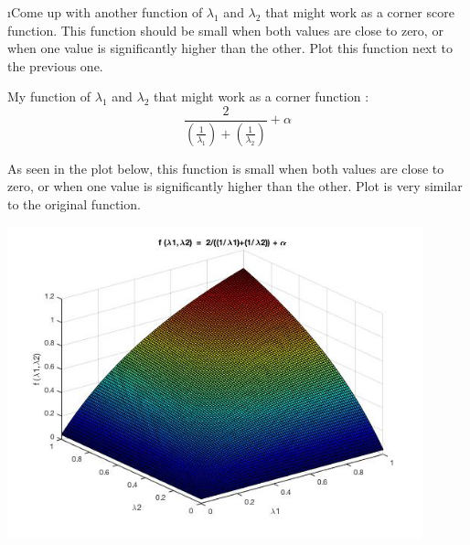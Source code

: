 \documentclass[fleqn]{article}
\begin{document}
\i Come up with another function of $\lambda_1$ and $\lambda_2$ that might work as a corner score function. This function should be small when both values are close to zero, or when one value is significantly higher than the other. Plot this function next to the previous one.
\ene

My function of  $\lambda_1$ and $\lambda_2$ that might work as a corner function :
\[
\frac{2}{(\frac{1}{\lambda_1}) + (\frac{1}{\lambda_2})} + \alpha
\]

As seen in the plot below, this function is small when both values are close to zero, or when one value is significantly higher than the other. Plot is very similar to the original function.
 
 \includegraphics[width=0.9\textwidth]{new.jpg}
\end{document}
